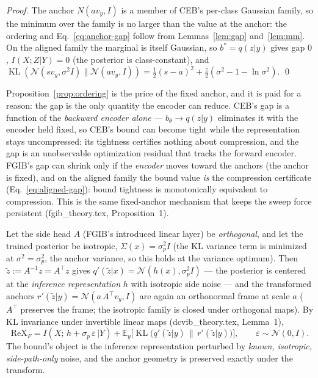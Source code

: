 \begin{proof}
The anchor $N(a v_y, I)$ is a member of CEB's per-class Gaussian family, so the minimum
over the family is no larger than the value at the anchor: the ordering and
Eq.~\eqref{eq:anchor-gap} follow from Lemmas~\ref{lem:gap} and~\ref{lem:mm}.
On the aligned family the marginal is itself Gaussian, so $b^* = q(z|y)$ gives gap $0$,
$I(X;Z|Y) = 0$ (the posterior is class-constant), and
$\operatorname{KL}(\mathcal{N}(s v_y, \sigma^2 I)\|\mathcal{N}(a v_y, I))
= \tfrac{1}{2}(s-a)^2 + \tfrac{z}{2}(\sigma^2-1-\ln\sigma^2)$. \hfill\qed
\end{proof}

\begin{remark}\label{rem:force}
Proposition~\ref{prop:ordering} is the price of the fixed anchor, and it is paid for a
reason: the gap is the only quantity the encoder can reduce. CEB's gap is a function of
the \emph{backward encoder alone} --- $b_\theta \to q(z|y)$ eliminates it with the encoder
held fixed, so CEB's bound can become tight while the representation stays uncompressed:
its tightness certifies nothing about compression, and the gap is an unobservable
optimization residual that tracks the forward encoder. FGIB's gap can shrink only if the
\emph{encoder} moves toward the anchors (the anchor is fixed), and on the aligned family
the bound value \emph{is} the compression certificate (Eq.~\eqref{eq:aligned-gap}): bound
tightness is monotonically equivalent to compression. This is the same fixed-anchor
mechanism that keeps the sweep force persistent (fgib\_theory.tex, Proposition~1).
\end{remark}

\begin{proposition}\label{prop:inverse}
Let the side head $A$ (FGIB's introduced linear layer) be \emph{orthogonal}, and let the
trained posterior be isotropic, $\Sigma(x) = \sigma_p^2 I$ (the KL variance term is
minimized at $\sigma^2 = \sigma_p^2$, the anchor variance, so this holds at the variance
optimum). Then $\tilde z := A^{-1} z = A^{\top} z$ gives
$q'(\tilde z|x) = \mathcal{N}(h(x), \sigma_p^2 I)$ --- the posterior is centered at the
\emph{inference representation} $h$ with isotropic side noise --- and the transformed
anchors $r'(\tilde z|y) = \mathcal{N}(a\, A^{\top} v_y, I)$ are again an orthonormal frame
at scale $a$ ($A^{\top}$ preserves the frame; the isotropic family is closed under
orthogonal maps). By KL invariance under invertible linear maps (dcvib\_theory.tex,
Lemma~1),
\begin{equation}
\mathrm{ReX}_F
= I(X;\, h + \sigma_p\,\varepsilon\,|Y)
+ \mathbb{E}_y\big[\operatorname{KL}\big(q'(\tilde z|y)\,\|\,r'(\tilde z|y)\big)\big],
\qquad \varepsilon \sim \mathcal{N}(0, I) .
\label{eq:object}
\end{equation}
The bound's object is the inference representation perturbed by \emph{known, isotropic,
side-path-only} noise, and the anchor geometry is preserved exactly under the transform.
\end{proposition}

